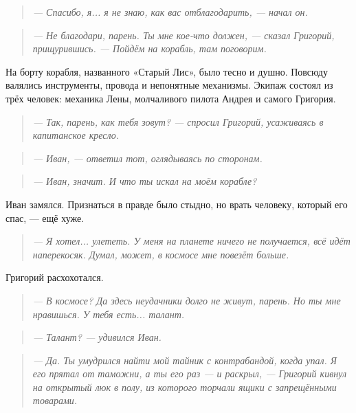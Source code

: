 \documentclass[12pt,a4paper]{book} %
\newenvironment{dialogue}{\begin{quote}\itshape}{\end{quote}}
\begin{document}
\begin{dialogue}
--- Спасибо, я... я не знаю, как вас отблагодарить, --- начал он.
\end{dialogue}

\begin{dialogue}
--- Не благодари, парень. Ты мне кое-что должен, --- сказал Григорий, прищурившись. --- Пойдём на корабль, там поговорим.
\end{dialogue}

На борту корабля, названного «Старый Лис», было тесно и душно. Повсюду валялись инструменты, провода и непонятные механизмы. Экипаж состоял из трёх человек: механика Лены, молчаливого пилота Андрея и самого Григория.

\begin{dialogue}
--- Так, парень, как тебя зовут? --- спросил Григорий, усаживаясь в капитанское кресло.
\end{dialogue}

\begin{dialogue}
--- Иван, --- ответил тот, оглядываясь по сторонам.
\end{dialogue}

\begin{dialogue}
--- Иван, значит. И что ты искал на моём корабле?
\end{dialogue}

Иван замялся. Признаться в правде было стыдно, но врать человеку, который его спас, --- ещё хуже.

\begin{dialogue}
--- Я хотел... улететь. У меня на планете ничего не получается, всё идёт наперекосяк. Думал, может, в космосе мне повезёт больше.
\end{dialogue}

Григорий расхохотался.

\begin{dialogue}
--- В космосе? Да здесь неудачники долго не живут, парень. Но ты мне нравишься. У тебя есть... талант.
\end{dialogue}

\begin{dialogue}
--- Талант? --- удивился Иван.
\end{dialogue}

\begin{dialogue}
--- Да. Ты умудрился найти мой тайник с контрабандой, когда упал. Я его прятал от таможни, а ты его раз --- и раскрыл, --- Григорий кивнул на открытый люк в полу, из которого торчали ящики с запрещёнными товарами.
\end{dialogue}
\end{document}
